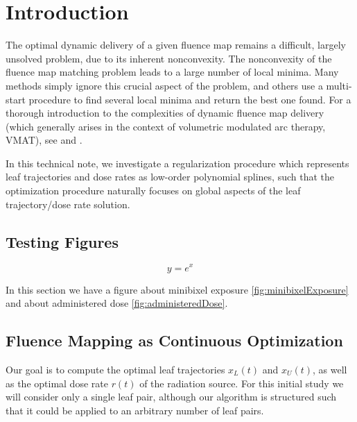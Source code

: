 \section{Introduction}
The optimal dynamic delivery of a given fluence map remains a difficult, largely unsolved problem, due to its inherent nonconvexity.
The nonconvexity of the fluence map matching problem leads to a large number of local minima.
Many methods simply ignore this crucial aspect of the problem, and others use a multi-start procedure to find several local minima and return the best one found.
For a thorough introduction to the complexities of dynamic fluence map delivery (which generally arises in the context of volumetric modulated arc therapy, VMAT),
see \cite{balvertcraft} and \cite{unkvmatreview}.

In this technical note, we investigate a regularization procedure which represents leaf trajectories and dose rates as low-order polynomial splines\footnotemark,
such that the optimization procedure naturally focuses on global aspects of the leaf trajectory/dose rate solution.


\subsection{Testing Figures}


\begin{equation}
y = e^x
\label{eqn:minibixelRefEqnTemplate}
\end{equation}





In this section we have a figure about minibixel exposure \ref{fig:minibixelExposure} and about administered dose \ref{fig:administeredDose}.

\subsection{Fluence Mapping as Continuous Optimization}

Our goal is to compute the optimal leaf trajectories $x_L(t)$ and $x_U(t)$, as well as the optimal dose rate $r(t)$ of the radiation source.
For this initial study we will consider only a single leaf pair, although our algorithm is structured such that it could be applied to an arbitrary number of leaf pairs.

